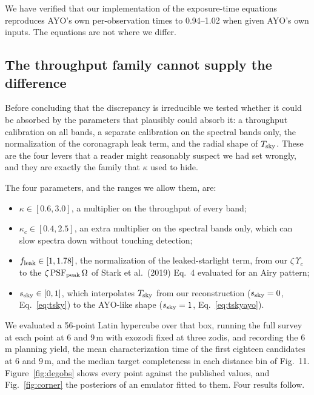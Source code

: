 \documentclass[11pt,a4paper]{article}
\begin{document}
We have verified that our implementation of the exposure-time equations reproduces AYO's own
per-observation times to 0.94--1.02 when given AYO's own inputs. The equations are not where we
differ.

\subsection{The throughput family cannot supply the difference}

Before concluding that the discrepancy is irreducible we tested whether it could be absorbed by
the parameters that plausibly could absorb it: a throughput calibration on all bands, a separate
calibration on the spectral bands only, the normalization of the coronagraph leak term, and the
radial shape of $T_{\rm sky}$. These are the four levers that a reader might reasonably suspect
we had set wrongly, and they are exactly the family that $\kappa$ used to hide.

The four parameters, and the ranges we allow them, are:
\begin{itemize}
\item $\kappa \in [0.6, 3.0]$, a multiplier on the throughput of every band;
\item $\kappa_c \in [0.4, 2.5]$, an extra multiplier on the spectral bands only, which can slow
  spectra down without touching detection;
\item $f_{\rm leak} \in [1, 1.78]$, the normalization of the leaked-starlight term, from our
  $\zeta\,\Upsilon_c$ to the $\zeta\,{\rm PSF}_{\rm peak}\,\Omega$ of Stark et al.\ (2019)
  Eq.~4 evaluated for an Airy pattern;
\item $s_{\rm sky} \in [0, 1]$, which interpolates $T_{\rm sky}$ from our reconstruction
  ($s_{\rm sky} = 0$, Eq.~\ref{eq:tsky}) to the AYO-like shape ($s_{\rm sky} = 1$,
  Eq.~\ref{eq:tskyayo}).
\end{itemize}
We evaluated a 56-point Latin hypercube over that box, running the full survey at each
point at 6 and $9\,$m with exozodi fixed at three zodis, and recording the $6\,$m planning yield,
the mean characterization time of the first eighteen candidates at 6 and $9\,$m, and the median
target completeness in each distance bin of Fig.~11. Figure~\ref{fig:degobs} shows every point
against the published values, and Fig.~\ref{fig:corner} the posteriors of an emulator fitted to
them. Four results follow.
\end{document}
